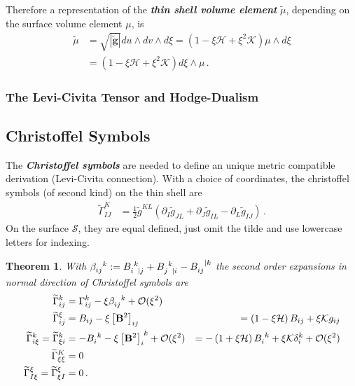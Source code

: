 \documentclass[a4paper,10pt]{scrartcl}
\newcommand{\surf}{\mathcal{S}}
\newcommand{\landau}{\mathcal{O}}
\newcommand{\gb}{\mathbf{g}}
\newcommand{\tgb}{\tilde{\gb}}
\newcommand{\tg}{\tilde{g}}
\newcommand{\Bb}{\mathbf{B}}
\newcommand{\tch}[2]{\widetilde{\Gamma}_{#1}^{#2}}
\newcommand{\ch}[2]{\Gamma_{#1}^{#2}}
\newcommand{\meanc}{\mathcal{H}}
\newcommand{\gaussc}{\mathcal{K}}
\newcommand{\formPeriod}{\,\text{.}}
\newcommand{\newterm}[1]{\textbf{\textit{#1}}}
\newtheorem{theorem}{Theorem}
\begin{document}
  Therefore a representation of the \newterm{thin shell volume element} \( \tilde{\mu} \), depending on the surface volume element \( \mu \), is
  \begin{align}
    \tilde{\mu} &= \sqrt{\left| \tgb \right|} du\wedge dv \wedge d\xi
            = \left(  1 - \xi\meanc + \xi^{2}\gaussc\right)  \mu \wedge d\xi \\
                &= \left(  1 - \xi\meanc + \xi^{2}\gaussc\right)  d\xi \wedge \mu \formPeriod
  \end{align}

\subsubsection{The Levi-Civita Tensor and Hodge-Dualism}

\subsection{Christoffel Symbols}
  The \newterm{Christoffel symbols} are needed to define an unique metric compatible derivation (Levi-Civita connection).
  With a choice of coordinates, the christoffel symbols (of second kind) on the thin shell are
  \begin{align}
    \tch{IJ}{K} &= \frac{1}{2} \tg^{KL}\left( \partial_{I}\tg_{JL} + \partial_{J}\tg_{IL} - \partial_{L}\tg_{IJ} \right)\formPeriod
  \end{align}
  On the surface \( \surf \), they are equal defined, just omit the tilde and use lowercase letters for indexing.
  \begin{theorem}
    With \( \tensor{\beta}{_{ij}^{k}} := \tensor{B}{_{i}^{k}_{|j}} +  \tensor{B}{_{j}^{k}_{|i}} - \tensor{B}{_{ij}^{|k}}\)
    the second order expansions in normal direction of Christoffel symbols are
    \begin{align}
      \tch{ij}{k} &= \ch{ij}{k} - \xi\tensor{\beta}{_{ij}^{k}} + \landau(\xi^{2})\\
      \tch{ij}{\xi} &= B_{ij} - \xi \left[ \Bb^{2} \right]_{ij} 
                          &= \left( 1 - \xi\meanc \right)B_{ij} + \xi\gaussc g_{ij}\\
      \tch{i\xi}{k} = \tch{\xi i}{k} &= -\tensor{B}{_{i}^{k}} - \xi\tensor{\left[ \Bb^{2} \right]}{_{i}^{k}} + \landau(\xi^{2})
                                        &= -\left( 1 + \xi\meanc \right)\tensor{B}{_{i}^{k}} + \xi\gaussc\delta_{i}^{k} + \landau(\xi^{2})\\
      \tch{\xi\xi}{K} &= 0 \\
      \tch{I\xi}{\xi} = \tch{\xi I}{\xi} &= 0 \formPeriod
    \end{align}
  \end{theorem}
\end{document}
